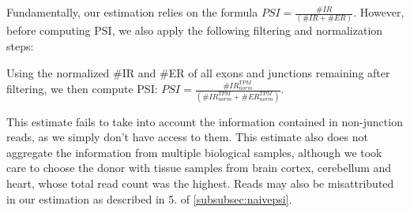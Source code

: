 Fundamentally, our estimation relies on the formula $PSI = \frac{\#IR}{(\#IR+\#ER)}$. However, before computing PSI, we also apply the following filtering and normalization steps:

Using the normalized \#IR and \#ER of all exons and junctions remaining after filtering, we then compute PSI: $PSI = \frac{\#IR^{TPM}_{norm}}{(\#IR^{TPM}_{norm}+\#ER^{TPM}_{norm})}$. 

This estimate fails to take into account the information contained in non-junction reads, as we simply don't have access to them.
This estimate also does not aggregate the information from multiple biological samples, although we took care to choose the donor with tissue samples from brain cortex, cerebellum and heart, whose total read count was the highest. 
Reads may also be misattributed in our estimation as described in 5. of \ref{subsubsec:naivepsi}.


